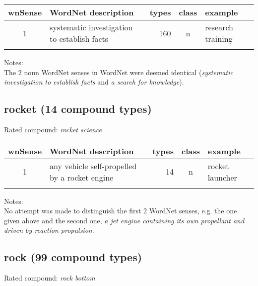 \vspace*{1ex}

\noindent
\begin{longtable}{c>{\raggedright\arraybackslash}p{5cm}rc>{\raggedright\arraybackslash}p{2cm}}\lsptoprule
{\small wnSense}&WordNet description&types&class&example\\\midrule
1&systematic investigation to establish facts&160&n&research training\\\lspbottomrule
\end{longtable}

\noindent
Notes:\\
The 2 noun WordNet senses in WordNet were deemed identical
(\emph{systematic investigation to establish facts} and \emph{a search
for knowledge}).

\subsection{rocket      (14 compound types)}
Rated compound: \emph{rocket science}

\vspace*{1ex}

\noindent
\begin{longtable}{c>{\raggedright\arraybackslash}p{5cm}rc>{\raggedright\arraybackslash}p{2cm}}\lsptoprule
{\small wnSense}&WordNet description&types&class&example\\\midrule
1&any vehicle self-propelled by a rocket engine&14&n&rocket launcher\\\lspbottomrule
\end{longtable}

\noindent
Notes:\\
No attempt was made to distinguish the first 2 WordNet senses,
e.g. the one given above and the second one, \emph{a jet engine containing its own propellant and driven by reaction propulsion}.

\pagebreak[4]
\subsection{rock         (99 compound types)}
Rated compound: \emph{rock bottom}

